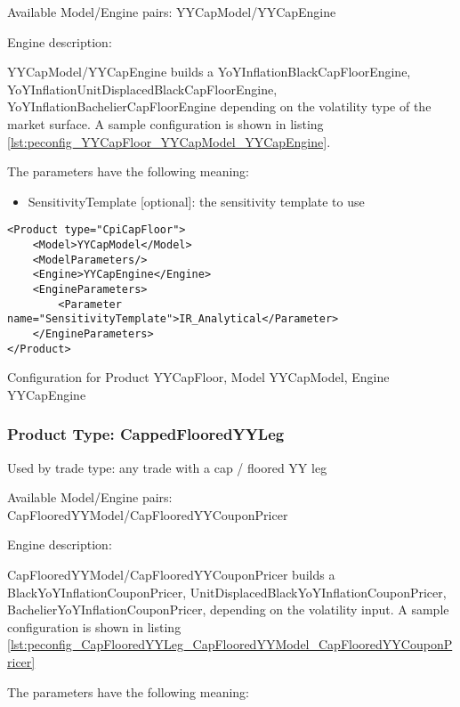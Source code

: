 Available Model/Engine pairs: YYCapModel/YYCapEngine

Engine description:

YYCapModel/YYCapEngine builds a YoYInflationBlackCapFloorEngine, YoYInflationUnitDisplacedBlackCapFloorEngine,
YoYInflationBachelierCapFloorEngine depending on the volatility type of the market surface. A sample configuration is
shown in listing \ref{lst:peconfig_YYCapFloor_YYCapModel_YYCapEngine}.

The parameters have the following meaning:

\begin{itemize}
\item SensitivityTemplate [optional]: the sensitivity template to use 
\end{itemize}

\begin{longlisting}
\begin{verbatim}
<Product type="CpiCapFloor">
    <Model>YYCapModel</Model>
    <ModelParameters/>
    <Engine>YYCapEngine</Engine>
    <EngineParameters>
        <Parameter name="SensitivityTemplate">IR_Analytical</Parameter>
    </EngineParameters>
</Product>
\end{verbatim}
\caption{Configuration for Product YYCapFloor, Model YYCapModel, Engine YYCapEngine}
\label{lst:peconfig_YYCapFloor_YYCapModel_YYCapEngine}
\end{longlisting}

\subsubsection{Product Type: CappedFlooredYYLeg}

Used by trade type: any trade with a cap / floored YY leg

Available Model/Engine pairs: CapFlooredYYModel/CapFlooredYYCouponPricer

Engine description:

CapFlooredYYModel/CapFlooredYYCouponPricer builds a BlackYoYInflationCouponPricer,
UnitDisplacedBlackYoYInflationCouponPricer, BachelierYoYInflationCouponPricer, depending on the volatility input. A
sample configuration is shown in listing \ref{lst:peconfig_CapFlooredYYLeg_CapFlooredYYModel_CapFlooredYYCouponPricer}

The parameters have the following meaning:

